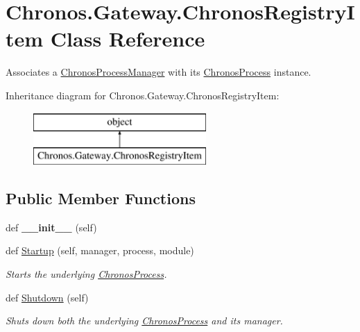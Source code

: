 \hypertarget{classChronos_1_1Gateway_1_1ChronosRegistryItem}{}\section{Chronos.\+Gateway.\+Chronos\+Registry\+Item Class Reference}
\label{classChronos_1_1Gateway_1_1ChronosRegistryItem}


Associates a \hyperlink{classChronos_1_1Gateway_1_1ChronosProcessManager}{Chronos\+Process\+Manager} with its \hyperlink{classChronos_1_1Gateway_1_1ChronosProcess}{Chronos\+Process} instance.  


Inheritance diagram for Chronos.\+Gateway.\+Chronos\+Registry\+Item\+:\begin{figure}[H]
\begin{center}
\leavevmode
\includegraphics[height=2.000000cm]{classChronos_1_1Gateway_1_1ChronosRegistryItem}
\end{center}
\end{figure}
\subsection*{Public Member Functions}
\begin{DoxyCompactItemize}
\item 
def {\bfseries \+\_\+\+\_\+init\+\_\+\+\_\+} (self)
\item 
def \hyperlink{group__Chronos_gae4d942c14fef0cc2abfc8ff9ca08eb14}{Startup} (self, manager, process, module)
\begin{DoxyCompactList}\small\item\em Starts the underlying \hyperlink{classChronos_1_1Gateway_1_1ChronosProcess}{Chronos\+Process}. \end{DoxyCompactList}\item 
def \hyperlink{group__Chronos_ga4094a3f48d548f9ed8c53ce14b900142}{Shutdown} (self)
\begin{DoxyCompactList}\small\item\em Shuts down both the underlying \hyperlink{classChronos_1_1Gateway_1_1ChronosProcess}{Chronos\+Process} and its manager. \end{DoxyCompactList}\end{DoxyCompactItemize}
